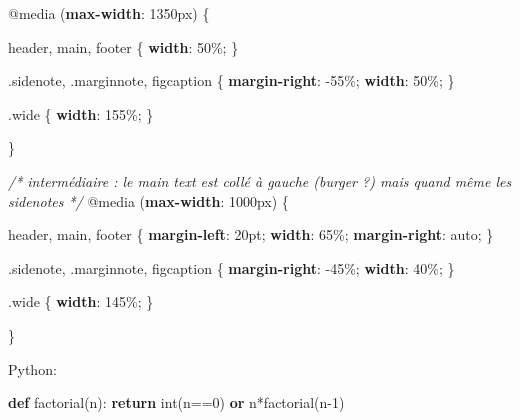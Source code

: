 \documentclass[
]{tufte-pandoc}
\newenvironment{Shaded}{}{}
\newcommand{\BuiltInTok}[1]{#1}
\newcommand{\CommentTok}[1]{\textcolor[rgb]{0.38,0.63,0.69}{\textit{#1}}}
\newcommand{\ControlFlowTok}[1]{\textcolor[rgb]{0.00,0.44,0.13}{\textbf{#1}}}
\newcommand{\DataTypeTok}[1]{\textcolor[rgb]{0.56,0.13,0.00}{#1}}
\newcommand{\DecValTok}[1]{\textcolor[rgb]{0.25,0.63,0.44}{#1}}
\newcommand{\FunctionTok}[1]{\textcolor[rgb]{0.02,0.16,0.49}{#1}}
\newcommand{\ImportTok}[1]{#1}
\newcommand{\KeywordTok}[1]{\textcolor[rgb]{0.00,0.44,0.13}{\textbf{#1}}}
\newcommand{\NormalTok}[1]{#1}
\newcommand{\OperatorTok}[1]{\textcolor[rgb]{0.40,0.40,0.40}{#1}}
\begin{document}
\begin{Shaded}
\begin{Highlighting}[]
\ImportTok{@media}\NormalTok{ (}\KeywordTok{max{-}width}\NormalTok{: }\DecValTok{1350}\DataTypeTok{px}\NormalTok{) \{}

\NormalTok{  header}\OperatorTok{,}\NormalTok{ main}\OperatorTok{,}\NormalTok{ footer \{}
    \KeywordTok{width}\NormalTok{: }\DecValTok{50}\DataTypeTok{\%}\OperatorTok{;}
\NormalTok{  \}}

  \FunctionTok{.sidenote}\OperatorTok{,}
  \FunctionTok{.marginnote}\OperatorTok{,}
\NormalTok{  figcaption \{}
    \KeywordTok{margin{-}right}\NormalTok{: }\DecValTok{{-}55}\DataTypeTok{\%}\OperatorTok{;}
    \KeywordTok{width}\NormalTok{: }\DecValTok{50}\DataTypeTok{\%}\OperatorTok{;}
\NormalTok{  \}}

  \FunctionTok{.wide}\NormalTok{ \{}
    \KeywordTok{width}\NormalTok{: }\DecValTok{155}\DataTypeTok{\%}\OperatorTok{;}
\NormalTok{  \}}

\NormalTok{\}}

\CommentTok{/* intermédiaire : le main text est collé à gauche (burger ?) mais quand même les sidenotes */}
\ImportTok{@media}\NormalTok{ (}\KeywordTok{max{-}width}\NormalTok{: }\DecValTok{1000}\DataTypeTok{px}\NormalTok{) \{}

\NormalTok{  header}\OperatorTok{,}\NormalTok{ main}\OperatorTok{,}\NormalTok{ footer \{}
    \KeywordTok{margin{-}left}\NormalTok{: }\DecValTok{20}\DataTypeTok{pt}\OperatorTok{;}
    \KeywordTok{width}\NormalTok{: }\DecValTok{65}\DataTypeTok{\%}\OperatorTok{;}
    \KeywordTok{margin{-}right}\NormalTok{: }\BuiltInTok{auto}\OperatorTok{;}
\NormalTok{  \}}

  \FunctionTok{.sidenote}\OperatorTok{,} \FunctionTok{.marginnote}\OperatorTok{,}\NormalTok{ figcaption \{}
    \KeywordTok{margin{-}right}\NormalTok{: }\DecValTok{{-}45}\DataTypeTok{\%}\OperatorTok{;}
    \KeywordTok{width}\NormalTok{: }\DecValTok{40}\DataTypeTok{\%}\OperatorTok{;}
\NormalTok{  \}}

  \FunctionTok{.wide}\NormalTok{ \{}
    \KeywordTok{width}\NormalTok{: }\DecValTok{145}\DataTypeTok{\%}\OperatorTok{;}
\NormalTok{  \}}

\NormalTok{\}}
\end{Highlighting}
\end{Shaded}

Python:

\begin{Shaded}
\begin{Highlighting}[]
\KeywordTok{def}\NormalTok{ factorial(n):}
        \ControlFlowTok{return} \BuiltInTok{int}\NormalTok{(n}\OperatorTok{==}\DecValTok{0}\NormalTok{) }\KeywordTok{or}\NormalTok{ n}\OperatorTok{*}\NormalTok{factorial(n}\OperatorTok{{-}}\DecValTok{1}\NormalTok{)}
\end{Highlighting}
\end{Shaded}
\end{document}
